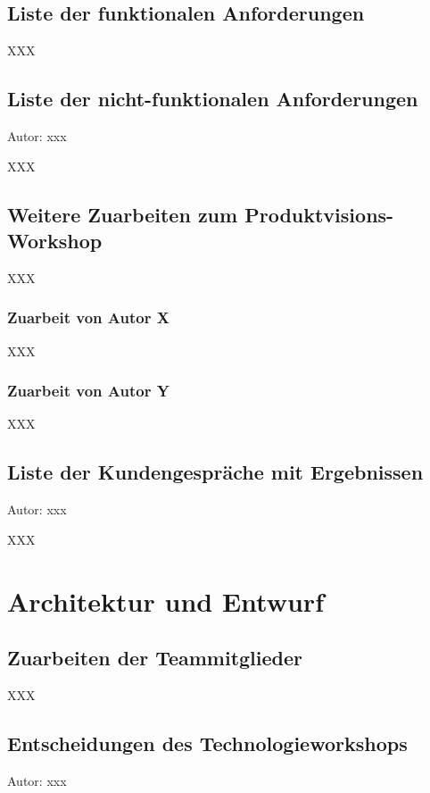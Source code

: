 \documentclass[twoside]{report}
\begin{document}
\subsection{Liste der funktionalen Anforderungen}

XXX

%
%
% 

\subsection{Liste der nicht-funktionalen Anforderungen}
{\small Autor: xxx}

XXX

\subsection{Weitere Zuarbeiten zum Produktvisions-Workshop}

XXX

\subsubsection{Zuarbeit von Autor X}
XXX
\subsubsection{Zuarbeit von Autor Y}
XXX

\subsection{Liste der Kundengespräche mit Ergebnissen}
{\small Autor: xxx}

XXX



\section{Architektur und Entwurf}

\subsection{Zuarbeiten der Teammitglieder}

XXX

\subsection{Entscheidungen des Technologieworkshops}
{\small Autor: xxx}
\end{document}
